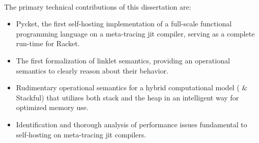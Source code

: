        \paragraph{}%
            The primary technical contributions of this dissertation are:
            \begin{itemize}
                \item Pycket, the first self-hosting implementation of a full-scale functional programming language on a meta-tracing \gls{jit} compiler, serving as a complete run-time for Racket.
                \item The first formalization of linklet semantics, providing an operational semantics to clearly reason about their behavior.
                \item Rudimentary operational semantics for a hybrid computational model ( \& Stackful) that utilizes both stack and the heap in an intelligent way for optimized memory use.
                \item Identification and thorough analysis of performance issues fundamental to self-hosting on meta-tracing \gls{jit} compilers.
            \end{itemize}







